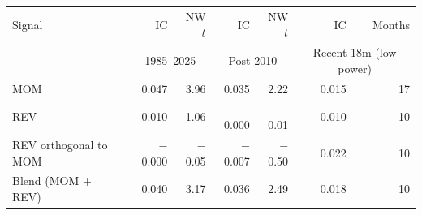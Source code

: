 \begin{tabular}{lrrrrrr}
\toprule
Signal & IC & NW $t$ & IC & NW $t$ & IC & Months \\ & \multicolumn{2}{c}{1985--2025} & \multicolumn{2}{c}{Post-2010} & \multicolumn{2}{c}{Recent 18m (low power)} \\
\midrule
MOM & 0.047 & 3.96 & 0.035 & 2.22 & 0.015 & 17 \\
REV & 0.010 & 1.06 & $-$0.000 & $-$0.01 & $-$0.010 & 10 \\
REV orthogonal to MOM & $-$0.000 & $-$0.05 & $-$0.007 & $-$0.50 & 0.022 & 10 \\
Blend (MOM + REV) & 0.040 & 3.17 & 0.036 & 2.49 & 0.018 & 10 \\
\bottomrule
\end{tabular}
